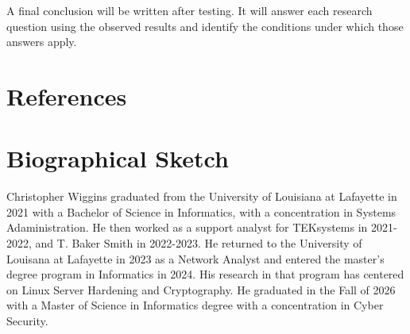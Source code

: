 \documentclass[12pt,letterpaper]{article}
\begin{document}
A final conclusion will be written after testing. It will answer each research question using the observed results and identify the conditions under which those answers apply.
\section{References}
\label{sec:org2242b89}
\section*{Biographical Sketch}
\label{sec:orga37f160}
{}

Christopher Wiggins graduated from the University of Louisiana at Lafayette in 2021 with a Bachelor of Science in Informatics, with a concentration in Systems Adaministration. He then worked as a support analyst for TEKsystems in 2021-2022, and T. Baker Smith in 2022-2023. He returned to the University of Louisana at Lafayette in 2023 as a Network Analyst and entered the master's degree program in Informatics in 2024. His research in that program has centered on Linux Server Hardening and Cryptography. He graduated in the Fall of 2026 with a Master of Science in Informatics degree with a concentration in Cyber Security. 
\end{document}
